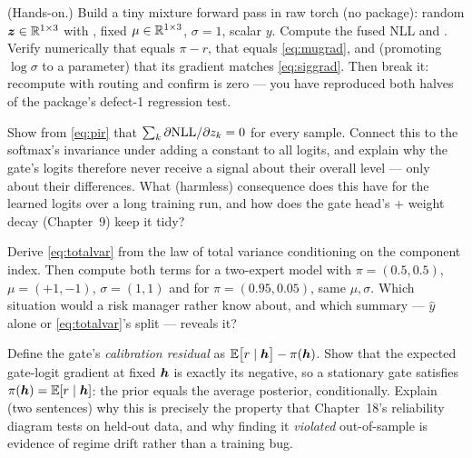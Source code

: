 \exercisehead

\begin{exercise}\label{ex:5-verify}
(Hands-on.) Build a tiny mixture forward pass in raw torch (no package):
random $\bm{z} \in \mathbb{R}^{1\times 3}$ with , fixed
$\mu \in \mathbb{R}^{1 \times 3}$, $\sigma = 1$, scalar $y$. Compute the fused
NLL and . Verify numerically that  equals
$\pi - r$, that  equals \eqref{eq:mugrad}, and (promoting
$\log\sigma$ to a parameter) that its gradient matches
\eqref{eq:siggrad}. Then break it: recompute with
 routing and confirm  is
zero --- you have reproduced both halves of the package's defect-1
regression test.
\end{exercise}

\begin{exercise}\label{ex:5-sumzero}
Show from \eqref{eq:pir} that $\sum_k \partial \mathrm{NLL}/\partial z_k = 0$
for every sample. Connect this to the softmax's invariance under adding a
constant to all logits, and explain why the gate's logits therefore never
receive a signal about their overall level --- only about their
differences. What (harmless) consequence does this have for the learned
logits over a long training run, and how does the gate head's
 + weight decay (Chapter~9) keep it tidy?
\end{exercise}

\begin{exercise}\label{ex:5-variance}
Derive \eqref{eq:totalvar} from the law of total variance conditioning
on the component index. Then compute both terms for a two-expert model
with $\pi = (0.5, 0.5)$, $\mu = (+1, -1)$, $\sigma = (1, 1)$ and for
$\pi = (0.95, 0.05)$, same $\mu, \sigma$. Which situation would a risk
manager rather know about, and which summary --- $\hat y$ alone or
\eqref{eq:totalvar}'s split --- reveals it?
\end{exercise}

\begin{exercise}\label{ex:5-calibration}
Define the gate's \emph{calibration residual} as
$\mathbb{E}\bigl[r \mid \bm{h}\bigr] - \pi(\bm{h})$. Show that the expected gate-logit
gradient at fixed $\bm{h}$ is exactly its negative, so a stationary gate
satisfies $\pi(\bm{h}) = \mathbb{E}[r \mid \bm{h}]$: the prior equals the average
posterior, conditionally. Explain (two sentences) why this is precisely
the property that Chapter~18's reliability diagram tests on held-out
data, and why finding it \emph{violated} out-of-sample is evidence of
regime drift rather than a training bug.
\end{exercise}

